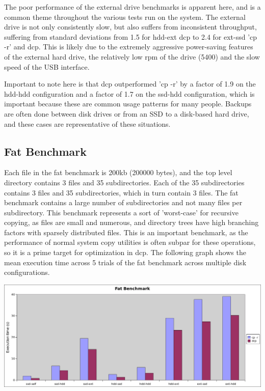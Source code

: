 \documentclass[12pt]{article}
\begin{document}
The poor performance of the external
drive benchmarks is apparent here, and is a common theme throughout
the various tests run on the system. The external drive is not only
consistently slow, but also suffers from inconsistent throughput,
suffering from standard deviations from 1.5 for hdd-ext dcp
to 2.4 for ext-ssd 'cp -r' and dcp. This is likely due to the
extremely aggressive power-saving features of the external hard drive,
the relatively low rpm of the drive (5400) and the slow speed of the
USB interface.

Important to note here is that dcp outperformed 'cp -r' by a factor
of 1.9 on the hdd-hdd configuration and a factor of 1.7 on the
ssd-hdd configuration, which is important because these are common
usage patterns for many people. Backups are often done between disk drives
or from an SSD to a disk-based hard drive, and these cases are representative
of these situations.

\subsection{Fat Benchmark}
Each file in the fat benchmark is 200kb (200000 bytes), and
the top level directory contains 3 files and 35 subdirectories. Each
of the 35 subdirectories contains 3 files and 35 subdirectories, which in turn contain 3 files.
The fat benchmark contains a large number of subdirectories and not many files per subdirectory.
This benchmark represents a sort of 'worst-case' for recursive copying, as files are small and numerous,
and directory trees have high branching factors with sparsely distributed files. This is an important
benchmark, as the performance of normal system copy utilities is often subpar for these operations,
so it is a prime target for optimization in dcp.
The following graph shows the mean execution time across 5 trials of the fat benchmark across multiple disk configurations.
\vspace{5mm}

\includegraphics[width=500pt]{graphs/fat-manydisk.png}
\end{document}

